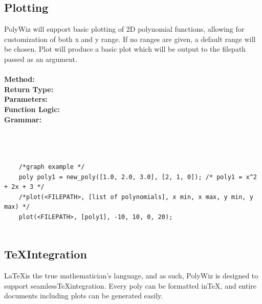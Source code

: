 \documentclass{article}
\begin{document}
\subsection{Plotting}
PolyWiz will support basic plotting of 2D polynomial functions, allowing for customization of both x and y range. If no ranges are given, a default range will be chosen. Plot will produce a basic plot which will be output to the filepath passed as an argument. \\ \\
\textbf{Method:} \\
\textbf{Return Type:}\\
\textbf{Parameters:}\\
\textbf{Function Logic:}\\
\textbf{Grammar:}\\
    \\
    \\
    \\
\begin{lstlisting}
    /*graph example */
    poly poly1 = new_poly([1.0, 2.0, 3.0], [2, 1, 0]); /* poly1 = x^2 + 2x + 3 */
    /*plot(<FILEPATH>, [list of polynomials], x min, x max, y min, y max) */
    plot(<FILEPATH>, [poly1], -10, 10, 0, 20);
    
\end{lstlisting}
\subsection{\TeX\text{ }Integration}
\LaTeX \text{ }is the true mathematician's language, and as such, PolyWiz is designed to support seamless\text{ }\TeX\text{ }integration. Every poly can be formatted in\text{ }\TeX\text{ }, and entire documents including plots can be generated easily.
\end{document}
